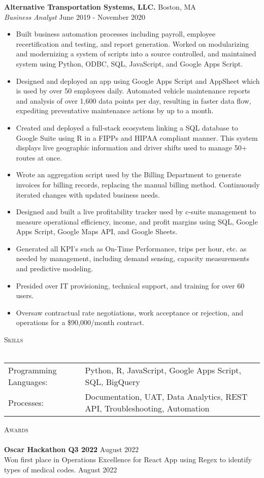 \documentclass[a4paper]{article}
\newcommand{\lineunder} {
    \vspace*{-8pt} \\
    \hspace*{-18pt} \hrulefill \\
}
\newcommand{\header} [1] {
    {\hspace*{-18pt}\vspace*{6pt} \textsc{#1}}
    \vspace*{-6pt} \lineunder
}
\begin{document}
\textbf{Alternative Transportation Systems, LLC.} \hfill Boston, MA\\
\textit{Business Analyst} \hfill June 2019 - November 2020\\
\vspace{-1mm}
\begin{itemize} \itemsep 1pt
	\item Built business automation processes including payroll, employee recertification and testing, and report generation. Worked on modularizing and modernizing a system of scripts into a source controlled, and maintained system using Python, ODBC, SQL, JavaScript, and Google Apps Script.
	\item Designed and deployed an app using Google Apps Script and AppSheet which is used by over 50 employees daily. Automated vehicle maintenance reports and analysis of over 1,600 data points per day, resulting in faster data flow, expediting preventative maintenance actions by up to a month.
	\item Created and deployed a full-stack ecosystem linking a SQL database to Google Suite using R in a FIPPs and HIPAA compliant manner. This system displays live geographic information and driver shifts used to manage 50+ routes at once.
	\item Wrote an aggregation script used by the Billing Department to generate invoices for billing records, replacing the manual billing method. Continuously iterated changes with updated business needs.
	\item Designed and built a live profitability tracker used by c-suite management to measure operational efficiency, income, and profit margins using SQL, Google Apps Script, Google Maps API, and Google Sheets.
	\item Generated all KPI’s such as On-Time Performance, trips per hour, etc. as needed by management, including demand sensing, capacity measurements and predictive modeling.
	\item Presided over IT provisioning, technical support, and training for over 60 users.
	\item Oversaw contractual rate negotiations, work acceptance or rejection, and operations for a \$90,000/month contract.
\end{itemize}



\header{Skills}
\begin{tabular}{ l l }
	Programming Languages: & Python, R, JavaScript, Google Apps Script, SQL, BigQuery \\
    Processes: & Documentation, UAT, Data Analytics, REST API, Troubleshooting, Automation \\
\end{tabular}
\vspace{2mm}


\header{Awards}
\textbf{Oscar Hackathon Q3 2022} \hfill August 2022\\
Won first place in Operations Excellence for React App using Regex to identify types of medical codes. \hfill August 2022\\
\vspace*{2mm}

\ 
\end{document}
